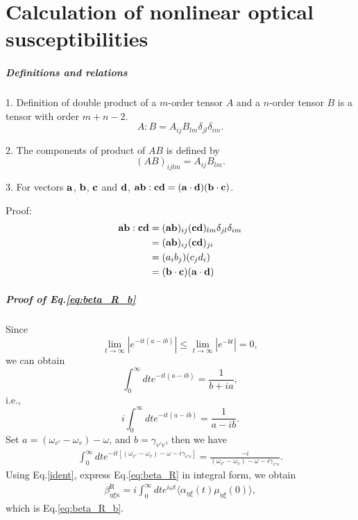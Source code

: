 \chapter{Calculation of nonlinear optical susceptibilities}\label{calculation_of_chi}

\paragraph{Definitions and relations}
1. Definition of double product of a $m$-order tensor $A$ and a $n$-order tensor $B$ is a tensor with order $m+n-2$.
\begin{equation}
    A:B=A_{ij}B_{lm}\delta_{jl}\delta_{im}.
\label{tensor_double_product}
\end{equation}

2. The components of product of $AB$ is defined by 
\begin{equation}
    (AB)_{ijlm}=A_{ij}B_{lm}.
\label{tensor_product}
\end{equation}

3. For vectors $\bf{a}$, $\bf{b}$, $\bf{c}$ and $\bf{d}$, ${\bf{ab}}:{\bf{cd}}=({\bf{a}}\cdot {\bf{d}})({\bf{b}}\cdot{\bf{c}})$.

Proof:
\begin{align}
    {\bf{ab}}:{\bf{cd}}&=({\bf{ab}})_{ij}({\bf{cd}})_{lm}\delta_{jl}\delta_{im} \nonumber \\
    &=({\bf{ab}})_{ij}({\bf{cd}})_{ji} \nonumber\\
    &=(a_i b_j)(c_j d_i) \nonumber\\
    &=({\bf{b}}\cdot{\bf{c}})({\bf{a}}\cdot{\bf{d}})
\end{align}

\paragraph{Proof of Eq.\thinspace\ref{eq:beta_R_b}} \label{identities}
Since 
\begin{equation}
  \lim_{t\to\infty} |e^{-it(a-ib)}|\le \lim_{t\to\infty} |e^{-bt}| = 0,\nonumber
  \label{integral_identity0}
\end{equation}
we can obtain
\begin{equation}
  \int_0^\infty dt e^{-it(a-ib)}=\frac{1}{b+ia},\nonumber
  \label{integral_identity0}
\end{equation}
i.e.,
\begin{equation}
  i\int_0^\infty dt e^{-it(a-ib)}=\frac{1}{a-ib}.\nonumber
  \label{integral_identity1}
\end{equation}
Set $a = (\omega_{v'} - \omega_{v}) - \omega$, and $b = \gamma_{v'v}$,
then we have
 \begin{align}
 \int_0^\infty dt e^{-it[(\omega_{v'}-\omega_v)-\omega-i\gamma_{v'v}]}=\frac{-i}{(\omega_{v'} -\omega_v)-\omega-i\gamma_{v'v}}.
 \label{ident}
 \end{align}
 Using Eq.\ref{ident}, express Eq.\ref{eq:beta_R} in integral form, we obtain
 \begin{align}
  \beta_{\eta\xi\kappa}^{\text{R}}=i\int_0^\infty dt e^{i\omega t} \langle\alpha_{\eta\xi}(t)\mu_{\eta\xi}(0)\rangle,\nonumber
 \end{align}
which is Eq.\ref{eq:beta_R_b}.


